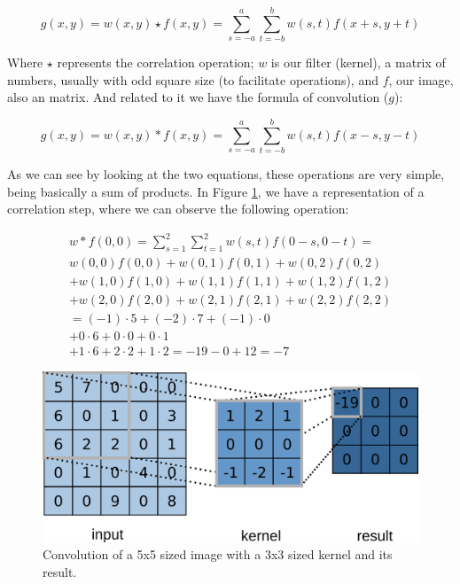 \begin{equation}
g(x,y)=w(x,y)\star f(x,y)=\sum_{s=-a}^a\sum_{t=-b}^bw(s,t)f(x+s,y+t)
\end{equation}

Where $\star$ represents the correlation operation; $w$ is our filter (kernel), a matrix of numbers, usually with odd square size (to facilitate operations), and $f$, our image, also an matrix. And related to it we have the formula of convolution ($g$):

\begin{equation}
g(x,y)=w(x,y)\ast f(x,y)=\sum_{s=-a}^a\sum_{t=-b}^bw(s,t)f(x-s,y-t)
\end{equation}

As we can see by looking at the two equations, these operations are very simple, being basically a sum of products. In Figure \ref{fig:figure117}, we have a representation of a correlation step, where we can observe the following operation:

\begin{equation}
\begin{split}
w*f(0,0)=\sum_{s=1}^{2}\sum_{t=1}^{2}w(s,t){f}(0-s,0-t)= \\
w(0,0)f(0,0)+w(0,1)f(0,1)+w(0,2)f(0,2) \\
+w(1,0)f(1,0)+w(1,1)f(1,1)+w(1,2)f(1,2) \\
+w(2,0)f(2,0)+w(2,1)f(2,1)+w(2,2)f(2,2)\\
=(-1)\cdot5+(-2)\cdot7+(-1)\cdot0\\
+0\cdot6+0\cdot0+0\cdot1\\
+1\cdot6+2\cdot2+1\cdot2
=-19-0+12=-7
\end{split}
\end{equation}

\begin{figure}
    \centering
    \includegraphics[scale=0.40]{"Part 3 - Learning Systems/Supervised Learning/Deep Learning/images/figure117.png"}
    \caption{Convolution of a 5x5 sized image with a 3x3 sized kernel and its result.}
    \label{fig:figure117}
\end{figure}

